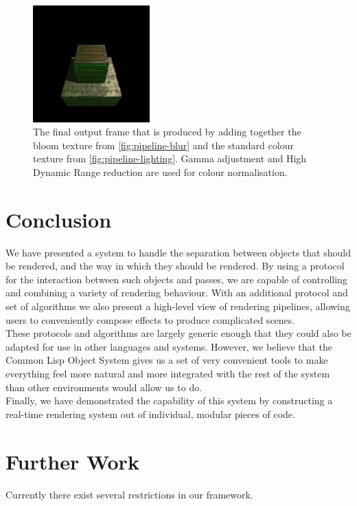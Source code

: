 \documentclass[format=sigconf]{acmart}
\begin{document}
\begin{figure}[h]
  \begin{center}
    \includegraphics[width=0.4\textwidth]{pipeline-frame.png}
  \end{center}
  \caption{The final output frame that is produced by adding together the bloom texture from \autoref{fig:pipeline-blur} and the standard colour texture from \autoref{fig:pipeline-lighting}. Gamma adjustment and High Dynamic Range reduction are used for colour normalisation.}
  \label{fig:pipeline-frame}
\end{figure}

\section{Conclusion}\label{conclusion}
We have presented a system to handle the separation between objects that should be rendered, and the way in which they should be rendered. By using a protocol for the interaction between such objects and passes, we are capable of controlling and combining a variety of rendering behaviour. With an additional protocol and set of algorithms we also present a high-level view of rendering pipelines, allowing users to conveniently compose effects to produce complicated scenes. \\

These protocols and algorithms are largely generic enough that they could also be adapted for use in other languages and systems. However, we believe that the Common Lisp Object System gives us a set of very convenient tools to make everything feel more natural and more integrated with the rest of the system than other environments would allow us to do. \\

Finally, we have demonstrated the capability of this system by constructing a real-time rendering system out of individual, modular pieces of code.

\section{Further Work}\label{further-work}
Currently there exist several restrictions in our framework. \\
\end{document}
